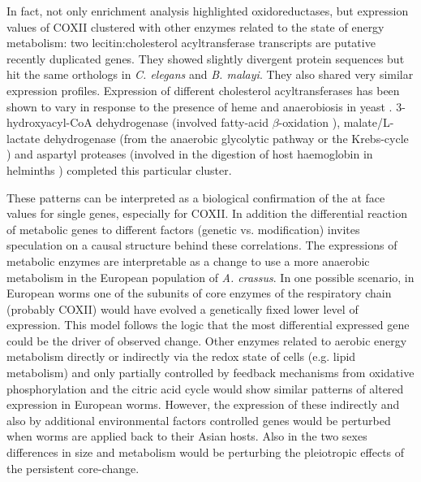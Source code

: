 In fact, not only enrichment analysis highlighted oxidoreductases, but
expression values of COXII clustered with other enzymes related to the
state of energy metabolism: two lecitin:cholesterol acyltransferase
transcripts are putative recently duplicated genes. They showed
slightly divergent protein sequences but hit the same orthologs in
\textit{C. elegans} and \textit{B. malayi}. They also shared very
similar expression profiles. Expression of different cholesterol
acyltransferases has been shown to vary in response to the presence of
heme and anaerobiosis in yeast \cite{pmid11786267}. 3-hydroxyacyl-CoA
dehydrogenase (involved fatty-acid $\beta$-oxidation
\cite{pmid8454629}), malate/L-lactate dehydrogenase (from the
anaerobic glycolytic pathway or the Krebs-cycle
\cite{sturm1969vergleichende}) and aspartyl proteases (involved in the
digestion of host haemoglobin in helminths \cite{pmid12782060})
completed this particular cluster.

These patterns can be interpreted as a biological confirmation of the
at face values for single genes, especially for COXII. In addition the
differential reaction of metabolic genes to different factors (genetic
vs. modification) invites speculation on a causal structure behind
these correlations. The expressions of metabolic enzymes are
interpretable as a change to use a more anaerobic metabolism in the
European population of \textit{A. crassus}. In one possible scenario,
in European worms one of the subunits of core enzymes of the
respiratory chain (probably COXII) would have evolved a genetically
fixed lower level of expression. This model follows the logic that the
most differential expressed gene could be the driver of observed
change. Other enzymes related to aerobic energy metabolism directly or
indirectly via the redox state of cells (e.g. lipid metabolism) and
only partially controlled by feedback mechanisms from oxidative
phosphorylation and the citric acid cycle would show similar patterns
of altered expression in European worms. However, the expression of
these indirectly and also by additional environmental factors
controlled genes would be perturbed when worms are applied back to
their Asian hosts. Also in the two sexes differences in size and
metabolism would be perturbing the pleiotropic effects of the
persistent core-change.

